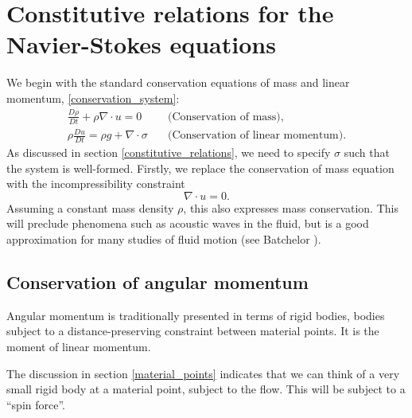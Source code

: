 \section{Constitutive relations for the Navier-Stokes equations}
We begin with the standard conservation equations of mass and linear momentum, \eqref{conservation_system}:
\begin{equation*}
\begin{split}
    \frac{D\rho}{Dt} + \rho\nabla\cdot u = 0 &\quad\text{(Conservation of mass)},
    \\
    \rho\frac{Du}{Dt} = \rho g + \nabla\cdot\sigma &\quad\text{(Conservation of linear momentum)}.
\end{split}
\end{equation*}
As discussed in section \ref{constitutive_relations}, we need to specify $\sigma$ such that the system is well-formed. Firstly, we replace the
conservation of mass equation with the incompressibility constraint
\begin{equation*}
    \nabla \cdot u = 0.
\end{equation*}
Assuming a constant mass density $\rho$, this also expresses mass conservation. This will preclude phenomena such as acoustic waves in the fluid,
but is a good approximation for many studies of fluid motion (see Batchelor \cite{batchelor}).

\subsection{Conservation of angular momentum}
Angular momentum is traditionally presented in terms of rigid bodies, bodies subject to a distance-preserving constraint between
material points. It is the moment of linear momentum.

The discussion in section \ref{material_points} indicates that we can think of a very small rigid body at a material point, subject to the flow.
This will be subject to a ``spin force''.

